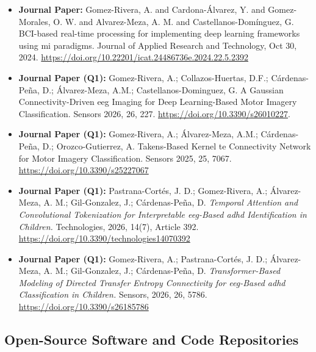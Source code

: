 \begin{itemize}
    \item \textbf{Journal Paper:} Gomez-Rivera, A. and Cardona-Álvarez, Y. and Gomez-Morales, O. W. and Alvarez-Meza, A. M. and Castellanos-Domínguez, G. BCI-based real-time processing for implementing deep learning frameworks using \gls{mi} paradigms. Journal of Applied Research and Technology, Oct 30, 2024. \url{https://doi.org/10.22201/icat.24486736e.2024.22.5.2392}
    
    \item \textbf{Journal Paper (Q1):} Gomez-Rivera, A.; Collazos-Huertas, D.F.; Cárdenas-Peña, D.; Álvarez-Meza, A.M.; Castellanos-Dominguez, G. A Gaussian Connectivity-Driven \gls{eeg} Imaging for Deep Learning-Based Motor Imagery Classification. Sensors 2026, 26, 227. \url{https://doi.org/10.3390/s26010227}.
    
    \item \textbf{Journal Paper (Q1):} Gomez-Rivera, A.; Álvarez-Meza, A.M.; Cárdenas-Peña, D.; Orozco-Gutierrez, A. Takens-Based Kernel \gls{te} Connectivity Network for Motor Imagery Classification. Sensors 2025, 25, 7067.  \url{https://doi.org/10.3390/s25227067}

    \item \textbf{Journal Paper (Q1):} Pastrana-Cortés, J. D.; Gomez-Rivera, A.; Álvarez-Meza, A. M.; Gil-Gonzalez, J.; Cárdenas-Peña, D.
    \emph{Temporal Attention and Convolutional Tokenization for Interpretable \gls{eeg}-Based \gls{adhd} Identification in Children.}
    Technologies, 2026, 14(7), Article 392.
    \href{https://doi.org/10.3390/technologies14070392}{https://doi.org/10.3390/technologies14070392}

    \item \textbf{Journal Paper (Q1):} Gomez-Rivera, A.; Pastrana-Cortés, J. D.; Álvarez-Meza, A. M.; Gil-Gonzalez, J.; Cárdenas-Peña, D.
    \emph{Transformer-Based Modeling of Directed Transfer Entropy Connectivity for \gls{eeg}-Based \gls{adhd} Classification in Children.}
    Sensors, 2026, 26, 5786.
    \href{https://doi.org/10.3390/s26185786}{https://doi.org/10.3390/s26185786}
       
\end{itemize}

\subsection{Open-Source Software and Code Repositories}


